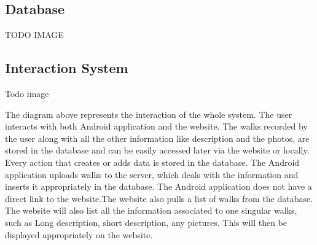 \documentclass[12pt]{article}
\begin{document}
\subsection{Database}
\par{TODO IMAGE}
\subsection{Interaction System}
\par{Todo image}
\par{The diagram above represents the interaction of the whole system. The user interacts with both Android application and the website. The walks recorded by the user along with all the other information like description and the photos, are stored in the database and can be easily accessed later via the website or locally. Every action that creates or adds data is stored in the database.
The Android application uploads walks to the server, which deals with the information and inserts it appropriately in the database. The Android application does not have a direct link to the website.The website also pulls a list of walks from the database. The website will also list all the information associated to one singular walks, such as Long description, short description, any pictures. This will then be displayed appropriately on the website.}
\end{document}
